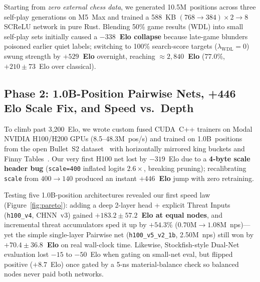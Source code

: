 \documentclass[10.5pt,letterpaper]{article}
\begin{document}
Starting from \emph{zero external chess data}, we generated 10.5M~positions across three self-play generations on M5~Max and trained a 588~KB $(768\to 384)\times 2\to 8$ SCReLU network in pure Rust. Blending 50\% game results (WDL) into small self-play sets initially caused a \textbf{$-338$~Elo collapse} because late-game blunders poisoned earlier quiet labels; switching to 100\% search-score targets ($\lambda_{\text{WDL}}=0$) swung strength by \textbf{$+529$~Elo} overnight, reaching \textbf{$\approx 2{,}840$~Elo} ($77.0\%$, $+210 \pm 73$~Elo over classical).

\subsection{Phase 2: 1.0B-Position Pairwise Nets, +446 Elo Scale Fix, and Speed vs.\ Depth}

To climb past 3,200~Elo, we wrote custom fused CUDA~C++ trainers on Modal NVIDIA H100/H200 GPUs (8.5--48.3M~pos/s) and trained on 1.0B~positions from the open Bullet~S2 dataset~\cite{bullet} with horizontally mirrored king buckets and Finny Tables~\cite{finnytables}. Our very first H100 net lost by $-319$~Elo due to a \textbf{4-byte scale header bug} (\texttt{scale=400} inflated logits $2.6\times$, breaking pruning); recalibrating \texttt{scale} from $400\to 140$ produced an instant \textbf{$+446$~Elo} jump with zero retraining.

Testing five 1.0B-position architectures revealed our first speed law (Figure~\ref{fig:pareto}): adding a deep 2-layer head + explicit Threat Inputs (\texttt{h100\_v4}, CHNN~v3) gained \textbf{$+183.2 \pm 57.2$~Elo at equal nodes}, and incremental threat accumulators sped it up by $+54.3\%$ ($0.70\text{M}\to 1.08\text{M}$~nps)—yet the simple single-layer Pairwise net (\texttt{h100\_v5\_v2\_1b}, 2.50M~nps) still won by \textbf{$+70.4 \pm 36.8$~Elo} on real wall-clock time. Likewise, Stockfish-style Dual-Net evaluation lost $-15$ to $-50$~Elo when gating on small-net eval, but flipped positive ($+8.7$~Elo) once gated by a 5-ns material-balance check so balanced nodes never paid both networks.
\end{document}
